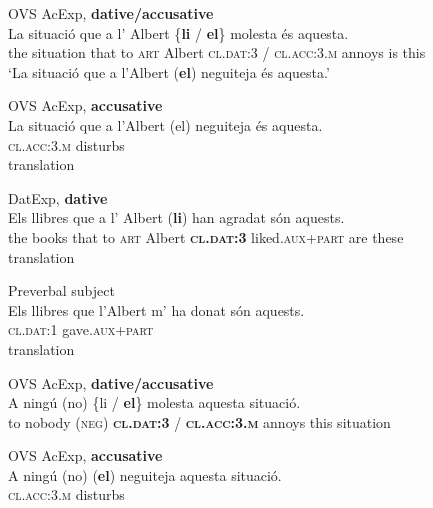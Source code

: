 \documentclass[output=paper,colorlinks,citecolor=brown,nonflat,modfonts]{langsci/langscibook}
\begin{document}
\ea%
 \label{ex:royo:10}
 \ea  OVS AcExp, \textbf{dative/accusative} \label{ex:royo:10a}\\
 \gll  La situació que a l’ Albert \{\textbf{li} / \textbf{el}\} molesta és aquesta.\\
	 the situation that to \textsc{art} Albert \textsc{cl.dat:3} / \textsc{cl.acc:3.m} annoys is this \\
 \glt `La situació que a l’Albert (\textbf{el}) neguiteja és aquesta.'
 
 \ex OVS AcExp, \textbf{accusative}\label{ex:royo:10b}\\
 \gll La  situació  que a  l’Albert (el) neguiteja és aquesta.\\
   \textsc{cl.acc}:3.\textsc{m} disturbs \\
 \glt  translation
  
 \ex  DatExp, \textbf{dative} \label{ex:royo:10c}\\
 \gll Els llibres que a l’ Albert (\textbf{li}) han agradat són aquests.\\
  the books that to \textsc{art} Albert \textbf{\textsc{cl.dat:3}} liked.\textsc{aux+part} are these\\
 \glt  translation
 
  
 
  
 \ex  Preverbal subject\label{ex:royo:10e}\\
 \gll  Els llibres que l’Albert m’ ha donat són aquests.\\
	 	 \textsc{cl.dat:1} gave.\textsc{aux+part} \\
 \glt  translation
 
 \z
 \z
 

\ea%
 \label{ex:royo:11}
 \ea OVS AcExp, \textbf{dative/accusative}\label{ex:royo:11a}\\
 \gll  A ningú (no) \{{li} / \textbf{el}\} molesta aquesta situació.\\
    to nobody (\textsc{neg}) \textbf{\textsc{cl.dat:3}} / \textbf{\textsc{cl.acc:3.m}} annoys this situation \\
\glt {}
 
 
 \ex OVS AcExp, \textbf{accusative} \label{ex:royo:11b}\\
 \gll A ningú (no) (\textbf{el}) neguiteja aquesta situació.\\
  	 \textsc{cl.acc:3.m} disturbs\\ 
\glt {}
 
\end{document}
